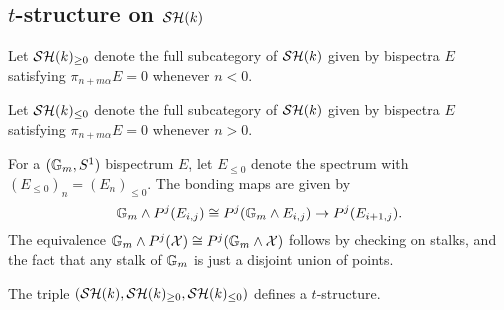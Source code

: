 \documentclass{amsart}%
\begin{document}
\subsection{$t$-structure on $\mathcal{SH}(k)$}

\begin{definition}
  Let $\mathcal{SH}(k)_{\geq 0}$ denote the full subcategory of $\mathcal{SH}(k)$ given
  by bispectra $E$ satisfying $\pi_{n+m\alpha}E = 0 $ whenever
  $n < 0$.

  Let $\mathcal{SH}(k)_{\leq 0}$ denote the full subcategory of $\mathcal{SH}(k)$ given
  by bispectra $E$ satisfying $\pi_{n+m\alpha}E = 0$ whenever $n >0$. 
\end{definition}

\begin{definition}
  For a $(\mathbb{G}_m, S^1)$ bispectrum $E$, let $E_{\leq 0}$ denote the
  spectrum with $(E_{\leq 0})_n = (E_n)_{\leq 0}$. The bonding maps
  are given by 
  \begin{equation*}
    \mathbb{G}_m \wedge P^j(E_{i,j}) \cong P^j( \mathbb{G}_m \wedge E_{i,j}) \to P^j( E_{i+1,j}).
  \end{equation*}
  The equivalence
  $\mathbb{G}_m \wedge P^j(\mathcal{X}) \cong P^j(\mathbb{G}_m\wedge \mathcal{X})$ follows by
  checking on stalks, and the fact that any stalk of $\mathbb{G}_m$ is just
  a disjoint union of points. 
\end{definition}

\begin{theorem}
  The triple $(\mathcal{SH}(k), \mathcal{SH}(k)_{\geq 0}, \mathcal{SH}(k)_{\leq 0})$ defines a
  $t$-structure.
\end{theorem}
\end{document}
